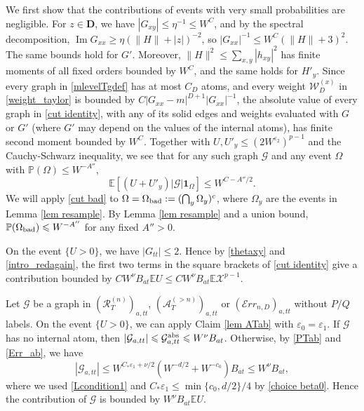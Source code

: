 \documentclass{article}
\newcommand{\1}{\mathds{1}}
\numberwithin{equation}{section}
\newcommand{\be}{\begin{equation}}
\newcommand{\ee}{\end{equation}}
\newcommand{\e}{{\varepsilon}}
\renewcommand{\cal}{\mathcal}
\renewcommand{\leq}{\leqslant}
\renewcommand{\geq}{\geqslant}
\renewcommand{\le}{\leq}
\renewcommand{\ge}{\geq}
\renewcommand{\P}{\mathbb{P}}
\newcommand{\E}{\mathbb{E}}
\DeclareMathOperator{\im}{Im}
\theoremstyle{plain} %
\theoremstyle{remark}
\newcommand{\PTn}{\mathcal R_T^{(n)}}
\newcommand{\ATn}{\mathcal A_T^{(>n)}}
\newcommand{\Err}{{\mathcal Err}}
\begin{document}
\medskip
{} We first show that the contributions of events with very small probabilities are negligible. For $z\in \mathbf D$, we have $|G_{xy}|\le \eta^{-1}\le W^C$, and by the spectral decomposition, $\im G_{xx}\ge \eta(\|H\|+|z|)^{-2}$, so $|G_{xx}|^{-1}\le W^C(\|H\|+3)^2$. The same bounds hold for $G'$. Moreover, $\|H\|^2\le \sum_{x,y}|h_{xy}|^2$ has finite moments of all fixed orders bounded by $W^C$, and the same holds for $H'_y$. Since every graph in \eqref{mlevelTgdef} has at most $C_D$ atoms, and every weight $\cal W^{(x)}_D$ in \eqref{weight_taylor} is bounded by $C|G_{xx}-m|^{D+1}|G_{xx}|^{-1}$, the absolute value of every graph in \eqref{cut identity}, with any of its solid edges and weights evaluated with $G$ or $G'$ (where $G'$ may depend on the values of the internal atoms), has finite second moment bounded by $W^{C}$. Together with $U,U'_y\le (2W^{\e_2})^{p-1}$ and the Cauchy-Schwarz inequality, we see that for any such graph $\cal G$ and any event $\Omega$ with $\P(\Omega)\le W^{-A''}$,
\be\label{cut bad}
\E\left[(U+U'_y)|\cal G|\mathbf 1_\Omega\right]\le W^{C-A''/2}.
\ee
We will apply \eqref{cut bad} to $\Omega=\Omega_{\rm bad}:=(\bigcap_y\Omega_y)^c$, where $\Omega_y$ are the events in Lemma \ref{lem resample}. By Lemma \ref{lem resample} and a union bound, $\P(\Omega_{\rm bad})\le W^{-A''}$ for any fixed $A''>0$.

\medskip
{} On the event $\{U>0\}$, we have $|G_{tt}|\le 2$. Hence by \eqref{thetaxy} and \eqref{intro_redagain}, the first two terms in the square brackets of \eqref{cut identity} give a contribution bounded by $CW^{\nu}B_{at}\E U\le CW^{\nu}B_{at}\E\cal X^{p-1}$.

\medskip
{} Let $\cal G$ be a graph in $(\PTn)_{a,tt}$, $(\ATn)_{a,tt}$ or $(\Err_{n,D})_{a,tt}$ without $P/Q$ labels. On the event $\{U>0\}$, we can apply Claim \ref{lem ATab} with $\e_0=\e_1$. If $\cal G$ has no internal atom, then $|\cal G_{a,tt}|\le \cal G^{\rm abs}_{a,tt}\le W^{\nu}B_{at}$. Otherwise, by \eqref{PTab} and \eqref{Err_ab}, we have
$$|\cal G_{a,tt}|\le W^{C_*\e_1+\nu/2}\left(W^{-d/2}+W^{-c_0}\right)B_{at}\le W^{\nu}B_{at},$$
where we used \eqref{Lcondition1} and $C_*\e_1\le \min\{c_0,d/2\}/4$ by \eqref{choice beta0}. Hence the contribution of $\cal G$ is bounded by $W^{\nu}B_{at}\E U$.
\end{document}

